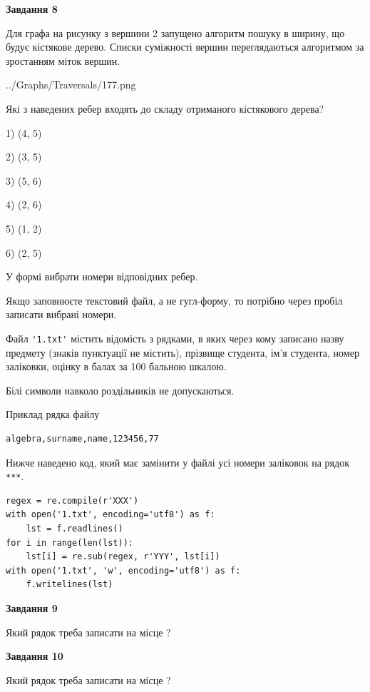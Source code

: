 \documentclass[12pt, ukrainian]{article}
\def\code#1{\Verb!#1!}
\begin{document}
{\begin {large}
{\begin {center}\textbf{Завдання 8}\end {center}}\par
Для графа на рисунку з вершини 2 запущено алгоритм пошуку в ширину, що будує кістякове дерево. Списки суміжності вершин переглядаються алгоритмом за зростанням міток вершин.\par
\begin{center}
	{../Graphs/Traversals/177.png}
\end{center}
\par Які з наведених ребер входять до складу отриманого кістякового дерева?\par
1) (4, 5)\par
2) (3, 5)\par
3) (5, 6)\par
4) (2, 6)\par
5) (1, 2)\par
6) (2, 5)\par
{\vskip 15pt} У формі вибрати номери відповідних ребер.


Якщо заповнюєте текстовий файл, а не гугл-форму, то потрібно через пробіл записа\-ти вибрані номери.\par
\newpage


Файл \code{'1.txt'} містить відомість з рядками, в яких через кому записа\-но назву предмету (знаків пунктуації не містить), прізвище студента, ім'я студента, номер залі\-ков\-ки, оцінку в балах за 100 бальною шкалою.

Білі символи навколо роздільників не допускаються.

Приклад рядка файлу



\begin{verbatim}
algebra,surname,name,123456,77
\end{verbatim}


Нижче наведено код, який має замінити у файлі усі номери заліковок на рядок \code{***}.



\begin{verbatim}
regex = re.compile(r'XXX')
with open('1.txt', encoding='utf8') as f:
    lst = f.readlines()
for i in range(len(lst)):
    lst[i] = re.sub(regex, r'YYY', lst[i])
with open('1.txt', 'w', encoding='utf8') as f:
    f.writelines(lst)
\end{verbatim}




{\begin {center}\textbf{Завдання 9}\end {center}}\par
Який рядок треба записати на місце  ?\par
\vspace{5mm}


{\begin {center}\textbf{Завдання 10}\end {center}}\par
Який рядок треба записати на місце  ?\par


\newpage


\end {large}}
\end{document}
